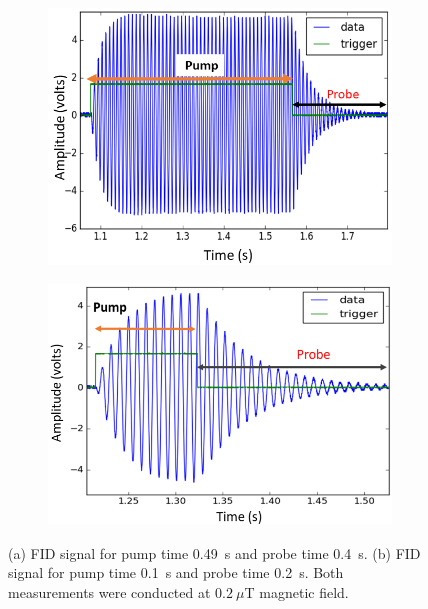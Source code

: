 \begin{figure}
\centering
\begin{subfigure}[b]{0.46\textwidth}
  \centering
  \includegraphics[width=\textwidth]{figures/FID_.png}
  \caption{}
  \label{fig:pump-long}
\end{subfigure}
\hfill
\begin{subfigure}[b]{0.48\textwidth}
  \centering
  \includegraphics[width=\textwidth]{figures/Capture.png}
  \caption{}
  \label{fig:pump-short}
\end{subfigure}
\caption{(a) FID signal for pump time 0.49~s and probe time 0.4~s. (b)
  FID signal for pump time 0.1~s and probe time 0.2~s.  Both
  measurements were conducted at $0.2~\mu$T magnetic field.}
    \label{fig:pump-time}
\end{figure} 


